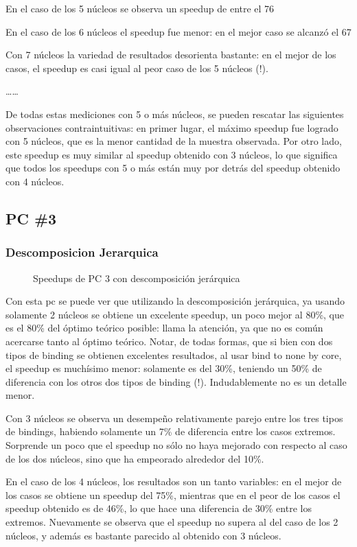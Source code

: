 \documentclass{article}
\begin{document}
En el caso de los 5 núcleos se observa un speedup de entre el 76%

En el caso de los 6 núcleos el speedup fue menor: en el mejor caso se alcanzó el 67%

Con 7 núcleos la variedad de resultados desorienta bastante: en el mejor de los casos, el speedup es casi igual al peor caso de los 5 núcleos (!).

……

De todas estas mediciones con 5 o más núcleos, se pueden rescatar las siguientes observaciones contraintuitivas: en primer lugar, el máximo speedup fue logrado con 5 núcleos, que es la menor cantidad de la muestra observada. Por otro lado, este speedup es muy similar al speedup obtenido con 3 núcleos, lo que significa que todos los speedups con 5 o más están muy por detrás del speedup obtenido con 4 núcleos.

\subsection{PC \#3}
\subsubsection{Descomposicion Jerarquica}
\begin{figure}[H]
    
    \caption{Speedups de PC 3 con descomposición jerárquica}
\end{figure}

Con esta pc se puede ver que utilizando la descomposición jerárquica, ya usando solamente 2 núcleos se obtiene un excelente speedup, un poco mejor al 80\%, que es el 80\% del óptimo teórico posible: llama la atención, ya que no es común acercarse tanto al óptimo teórico. Notar, de todas formas, que si bien con dos tipos de binding se obtienen excelentes resultados, al usar bind to none by core, el speedup es muchísimo menor: solamente es del 30\%, teniendo un 50\% de diferencia con los otros dos tipos de binding (!). Indudablemente no es un detalle menor.

Con 3 núcleos se observa un desempeño relativamente parejo entre los tres tipos de bindings, habiendo solamente un 7\% de diferencia entre los casos extremos. Sorprende un poco que el speedup no sólo no haya mejorado con respecto al caso de los dos núcleos, sino que ha empeorado alrededor del 10\%.

En el caso de los 4 núcleos, los resultados son un tanto variables: en el mejor de los casos se obtiene un speedup del 75\%, mientras que en el peor de los casos el speedup obtenido es de 46\%, lo que hace una diferencia de 30\% entre los extremos. Nuevamente se observa que el speedup no supera al del caso de los 2 núcleos, y además es bastante parecido al obtenido con 3 núcleos. 
\end{document}

